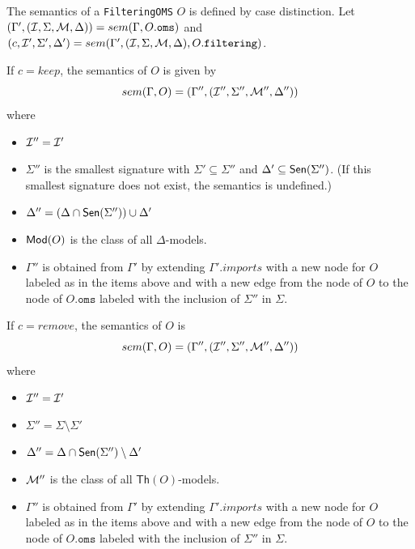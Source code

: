 \documentclass[10pt, a4paper]{isov2}
\newcommand*{\syntax}[1]{\texttt{#1}}
\renewcommand{\Th}{\mathsf{Th}}
\begin{document}
The semantics of a \syntax{FilteringOMS} $O$
is defined by case distinction.
Let
 $(\Gamma',(\cI,\Sigma,\cM, \Delta)) = sem(\Gamma, O.\syntax{oms})$ and
 $(c, \cI',\Sigma',\Delta') = sem(\Gamma', (\cI, \Sigma, \cM, \Delta), O.\syntax{filtering})$.
 
If $c = keep$, 
the semantics of $O$ is given by
$$sem(\Gamma, O) = (\Gamma'',({\cal I}'',\Sigma'',{\cal M}'',\Delta''))$$
\noindent where
\begin{itemize}
  \item ${\cal I}'' = {\cal I}'$
  \item $\Sigma''$ is the smallest signature
with $\Sigma'\subseteq\Sigma''$ and $\Delta'\subseteq\mathsf{Sen}(\Sigma'')$. ({If this smallest signature does not exist, the semantics is undefined.})
  \item $\Delta'' = (\Delta\cap\mathsf{Sen}(\Sigma''))\cup\Delta'$
  \item $\mathsf{Mod}(O)$ is the class of all $\Delta$-models.
  \item $\Gamma''$ is obtained from 
       $\Gamma'$
       by extending $\Gamma'.imports$
       with a new node for $O$ labeled as in the items above and
       with a new edge from the node of $O$ to the node of $O.\syntax{oms}$
        labeled with the inclusion of $\Sigma''$ in $\Sigma$.
\end{itemize}

\noindent
If $c = remove$, the semantics of $O$  
is
$$sem(\Gamma, O) = (\Gamma'',({\cal I}'',\Sigma'',{\cal M}'',\Delta''))$$
\noindent where
\begin{itemize}
  \item ${\cal I}'' = {\cal I}'$
  \item $\Sigma'' = \Sigma\setminus \Sigma'$ 
  \item $\Delta'' = \Delta\cap\mathsf{Sen}(\Sigma'')\setminus\Delta'$
  \item ${\cal M}''$ is the class of all $\Th(O)$-models.
    \item $\Gamma''$ is obtained from 
       $\Gamma'$
       by extending $\Gamma'.imports$
       with a new node for $O$ labeled as in the items above and
       with a new edge from the node of $O$ to the node of $O.\syntax{oms}$
        labeled with the inclusion of $\Sigma''$ in $\Sigma$.
\end{itemize}

\end{document}
